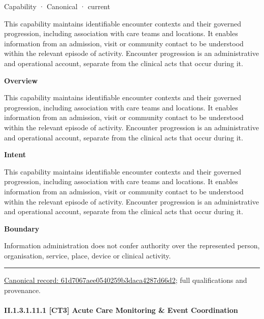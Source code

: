 \label{element:61d7067aee0540259b3daca4287d66d2}
{\small Capability · Canonical · current}\par

This capability maintains identifiable encounter contexts and their governed progression, including association with care teams and locations. It enables information from an admission, visit or community contact to be understood within the relevant episode of activity. Encounter progression is an administrative and operational account, separate from the clinical acts that occur during it.



\textbf{Overview}



This capability maintains identifiable encounter contexts and their governed progression, including association with care teams and locations. It enables information from an admission, visit or community contact to be understood within the relevant episode of activity. Encounter progression is an administrative and operational account, separate from the clinical acts that occur during it.



\textbf{Intent}



This capability maintains identifiable encounter contexts and their governed progression, including association with care teams and locations. It enables information from an admission, visit or community contact to be understood within the relevant episode of activity. Encounter progression is an administrative and operational account, separate from the clinical acts that occur during it.



\textbf{Boundary}



Information administration does not confer authority over the represented person, organisation, service, place, device or clinical activity.



\medskip\hrule\medskip

{\footnotesize \href{../../../../continuum/strategy/capability/61d7067aee0540259b3daca4287d66d2.md}{Canonical record: 61d7067aee0540259b3daca4287d66d2}; full qualifications and provenance.}\par
\paragraph*{II.1.3.1.11.1 [CT3] Acute Care Monitoring \& Event Coordination}
\label{navigation:II.1.3.1.11.1}

